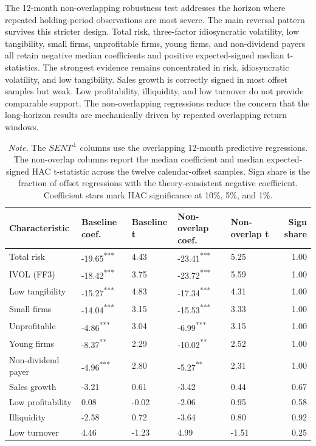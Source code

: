 \documentclass[11pt]{article}
\newcommand{\var}[1]{\ensuremath{#1}}
\newcommand{\tablenote}[1]{\caption*{\footnotesize \textit{Note.} #1}}
\begin{document}
The 12-month non-overlapping robustness test addresses the horizon where repeated holding-period observations are most severe. The main reversal pattern survives this stricter design. Total risk, three-factor idiosyncratic volatility, low tangibility, small firms, unprofitable firms, young firms, and non-dividend payers all retain negative median coefficients and positive expected-signed median t-statistics. The strongest evidence remains concentrated in risk, idiosyncratic volatility, and low tangibility. Sales growth is correctly signed in most offset samples but weak. Low profitability, illiquidity, and low turnover do not provide comparable support. The non-overlapping regressions reduce the concern that the long-horizon results are mechanically driven by repeated overlapping return windows.

\begin{table}[H]
    \centering
    \caption{Persistence robustness: 12-month non-overlapping horizon regressions}
    \label{tab:nonoverlap_robustness}
    \small
    \begin{tabular}{lllllr}
        \toprule
        Characteristic & Baseline coef. & Baseline t & Non-overlap coef. & Non-overlap t & Sign share \\
        \midrule
        Total risk & -19.65\textsuperscript{***} & 4.43 & -23.41\textsuperscript{***} & 5.25 & 1.00 \\
        IVOL (FF3) & -18.42\textsuperscript{***} & 3.75 & -23.72\textsuperscript{***} & 5.59 & 1.00 \\
        Low tangibility & -15.27\textsuperscript{***} & 4.83 & -17.34\textsuperscript{***} & 4.31 & 1.00 \\
        Small firms & -14.04\textsuperscript{***} & 3.15 & -15.53\textsuperscript{***} & 3.33 & 1.00 \\
        Unprofitable & -4.86\textsuperscript{***} & 3.04 & -6.99\textsuperscript{***} & 3.15 & 1.00 \\
        Young firms & -8.37\textsuperscript{**} & 2.29 & -10.02\textsuperscript{**} & 2.52 & 1.00 \\
        Non-dividend payer & -4.96\textsuperscript{***} & 2.80 & -5.27\textsuperscript{**} & 2.31 & 1.00 \\
        Sales growth & -3.21 & 0.61 & -3.42 & 0.44 & 0.67 \\
        Low profitability & 0.08 & -0.02 & -2.06 & 0.95 & 0.58 \\
        Illiquidity & -2.58 & 0.72 & -3.64 & 0.80 & 0.92 \\
        Low turnover & 4.46 & -1.23 & 4.99 & -1.51 & 0.25 \\
        \bottomrule
    \end{tabular}
    \tablenote{The \var{SENT^{\perp}} columns use the overlapping 12-month predictive regressions. The non-overlap columns report the median coefficient and median expected-signed HAC t-statistic across the twelve calendar-offset samples. Sign share is the fraction of offset regressions with the theory-consistent negative coefficient. Coefficient stars mark HAC significance at 10\%, 5\%, and 1\%.}
\end{table}
\end{document}
